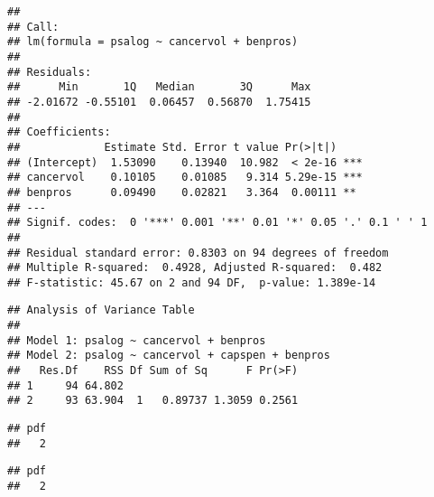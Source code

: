 \begin{knitrout}
\begin{kframe}
\begin{alltt}
\end{alltt}
\begin{verbatim}
##
## Call:
## lm(formula = psalog ~ cancervol + benpros)
##
## Residuals:
##      Min       1Q   Median       3Q      Max
## -2.01672 -0.55101  0.06457  0.56870  1.75415
##
## Coefficients:
##             Estimate Std. Error t value Pr(>|t|)
## (Intercept)  1.53090    0.13940  10.982  < 2e-16 ***
## cancervol    0.10105    0.01085   9.314 5.29e-15 ***
## benpros      0.09490    0.02821   3.364  0.00111 **
## ---
## Signif. codes:  0 '***' 0.001 '**' 0.01 '*' 0.05 '.' 0.1 ' ' 1
##
## Residual standard error: 0.8303 on 94 degrees of freedom
## Multiple R-squared:  0.4928, Adjusted R-squared:  0.482
## F-statistic: 45.67 on 2 and 94 DF,  p-value: 1.389e-14
\end{verbatim}
\begin{alltt}
\end{alltt}
\begin{verbatim}
## Analysis of Variance Table
##
## Model 1: psalog ~ cancervol + benpros
## Model 2: psalog ~ cancervol + capspen + benpros
##   Res.Df    RSS Df Sum of Sq      F Pr(>F)
## 1     94 64.802
## 2     93 63.904  1   0.89737 1.3059 0.2561
\end{verbatim}
\begin{alltt}
\hlstd{(}\hlstd{,} \hlstd{=}\hlstd{,} \hlstd{=}\hlstd{)}
\hlstd{(} 
\hlstd{(} \hlstd{=} \hlstd{)}
\hlstd{()}
\end{alltt}
\begin{verbatim}
## pdf
##   2
\end{verbatim}
\begin{alltt}
\hlstd{(}\hlstd{,} \hlstd{=}\hlstd{,} \hlstd{=}\hlstd{)}
\hlstd{(} \hlstd{(}
\hlstd{()}
\end{alltt}
\begin{verbatim}
## pdf
##   2
\end{verbatim}
\begin{alltt}

\end{alltt}
\end{kframe}
\end{knitrout}
